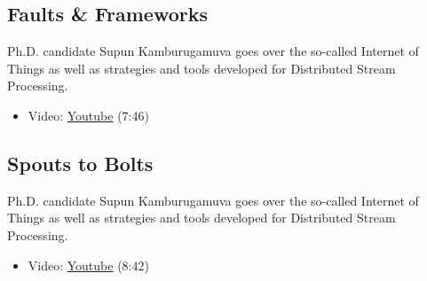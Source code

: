 \subsection{Faults \& Frameworks}\label{faults-frameworks}

Ph.D. candidate Supun Kamburugamuva goes over the so-called Internet of
Things as well as strategies and tools developed for Distributed Stream
Processing.

\begin{itemize}
\tightlist
\item
  Video: \href{https://www.youtube.com/watch?v=2ip9ttBMTlQ}{Youtube}
  (7:46)
\end{itemize}

\subsection{Spouts to Bolts}\label{spouts-to-bolts}

Ph.D. candidate Supun Kamburugamuva goes over the so-called Internet of
Things as well as strategies and tools developed for Distributed Stream
Processing.

\begin{itemize}
\tightlist
\item
  Video: \href{https://www.youtube.com/watch?v=E9E-ygRXcm8}{Youtube}
  (8:42)
\end{itemize}
